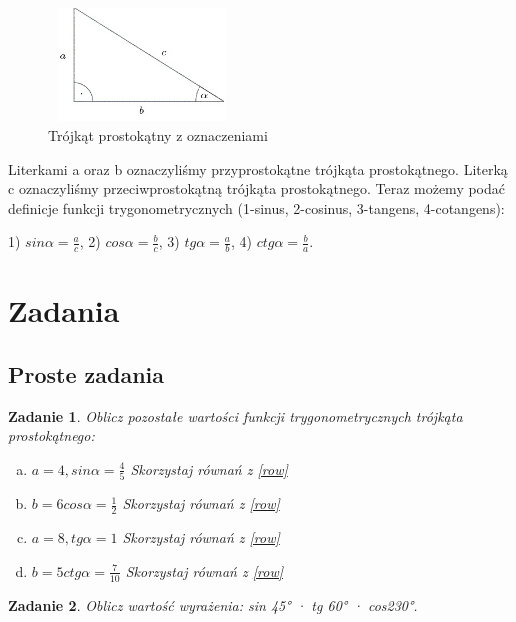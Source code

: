 \documentclass[12pt,a4paper]{article}
\newtheorem{zad}{Zadanie}[section]
\begin{document}
\begin{figure}
\centering
\includegraphics[width=5cm,height=3cm]{troj}
\caption{Trójkąt prostokątny z oznaczeniami}
\label{fig:obrazek troj}
\end{figure}


Literkami a oraz b oznaczyliśmy przyprostokątne trójkąta prostokątnego.
Literką c oznaczyliśmy przeciwprostokątną trójkąta prostokątnego.
Teraz możemy podać definicje funkcji trygonometrycznych (1-sinus, 2-cosinus, 3-tangens, 4-cotangens):

\begin{center}
\label{row}
1) $sinα=\frac{a}{c}$,
\label{row}
2) $cosα=\frac{b}{c}$,
\label{row}
3) $tgα=\frac{a}{b}$,
\label{row}
4) $ctgα=\frac{b}{a}$.

\end{center}

\cite{od1}


\newpage
\section{Zadania}

\subsection{Proste zadania}

\begin{zad}
Oblicz pozostałe wartości funkcji trygonometrycznych trójkąta prostokątnego:

\begin{enumerate}[a)]
\item $a=4 , sinα=\frac{4}{5}$ Skorzystaj równań z \ref{row}
\item $b=6 cosα=\frac{1}{2}$   Skorzystaj równań z \ref{row}
\item $a=8 ,tgα=1$             Skorzystaj równań z \ref{row}  
\item $b=5 ctgα=\frac{7}{10}$  Skorzystaj równań z \ref{row}
\end{enumerate}

\end{zad}

\begin{zad}
Oblicz wartość wyrażenia: sin 45° · tg 60° · cos230°.
\end{zad}
\end{document}
